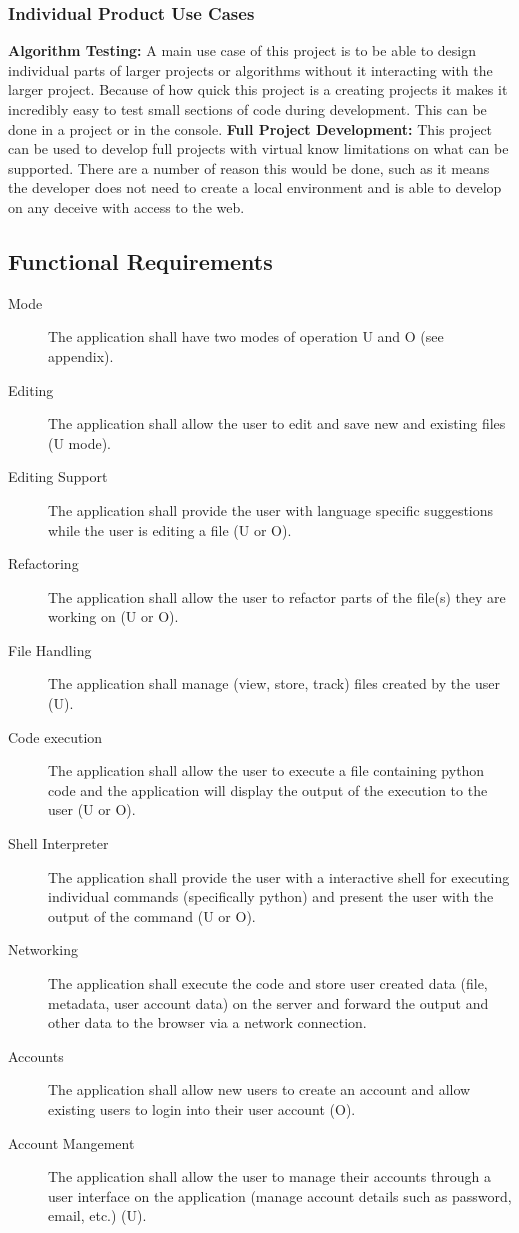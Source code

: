 \documentclass[12pt, titlepage]{article}
\begin{document}
    \subsubsection{Individual Product Use Cases}
		\textbf{Algorithm Testing:} A main use case of this project is to be able
		to design individual parts of larger projects or algorithms without it
		interacting with the larger project. Because of how quick this project is a
		creating  projects it makes it incredibly easy to test small sections of
		code during development. This can be done in a project or in the console.
		\newline\newline
		\textbf{Full Project Development:} This project can be used to develop full
		projects with virtual know limitations on what can be supported.  There are
		a number of reason this would be done, such as it means the developer does
		not need to create a local environment and is able to develop on any
		deceive with access to the web.

  \subsection{Functional Requirements}
	\begin{description}
		\item [Mode] The application shall have two modes of operation U and O (see
			appendix).
		\item [Editing] The application shall allow the user to edit and
			save new and existing files (U mode).
		\item [Editing Support] The application shall provide the user with
			language specific suggestions while the user is editing a file (U or O).
		\item [Refactoring] The application shall allow the user to refactor parts
			of the file(s) they are working on (U or O).
		\item [File Handling] The application shall manage (view, store, track)
			files created by the user (U).
		\item [Code execution] The application shall allow the user to execute a
			file containing python code and the application will display the output
			of the execution to the user (U or O).
		\item [Shell Interpreter] The application shall provide the user with a
			interactive shell for executing individual commands (specifically python)
			and present the user with the output of the command (U or O).
		\item [Networking] The application shall execute the code and store user
			created data (file, metadata, user account data) on the server and
			forward the output and other data to the browser via a network
			connection.
		\item [Accounts] The application shall allow new users to create an account
			and allow existing users to login into their user account (O).
		\item [Account Mangement] The application shall allow the user to manage
			their accounts through a user interface on the application (manage
			account details such as password, email, etc.) (U).
	\end{description}
\end{document}
